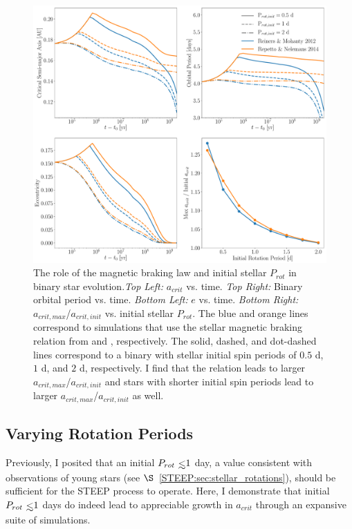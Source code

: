 \begin{figure}
	\includegraphics[width=\columnwidth]{var_MB.pdf}
   \caption{The role of the magnetic braking law and initial stellar $P_{rot}$ in binary star evolution.{\it Top Left:} $a_{crit}$ vs. time.  {\it Top Right:} Binary orbital period vs. time. {\it Bottom Left:} $e$ vs. time. {\it Bottom Right:} $a_{crit,max}$/$a_{crit,init}$ vs. initial stellar $P_{rot}$.  The blue and orange lines correspond to simulations that use the stellar magnetic braking relation from \citet{Reiners2012} and \citet{Repetto2014}, respectively.  The solid, dashed, and dot-dashed lines correspond to a binary with stellar initial spin periods of $0.5$ d, $1$ d, and $2$ d, respectively.  I find that the \citet{Repetto2014} relation leads to larger $a_{crit,max}$/$a_{crit,init}$ and stars with shorter initial spin periods lead to larger $a_{crit,max}$/$a_{crit,init}$ as well.}
    \label{STEEP:fig:var_mb}
\end{figure}

\subsection{Varying Rotation Periods} \label{STEEP:sec:var_rot}

Previously, I posited that an initial $P_{rot} \lsim 1$ day, a value consistent with observations of young stars (see $\S$~\ref{STEEP:sec:stellar_rotations}), should be sufficient for the STEEP process to operate.  Here, I demonstrate that initial $P_{rot} \lsim 1$ days do indeed lead to appreciable growth in $a_{crit}$ through an expansive suite of simulations.

